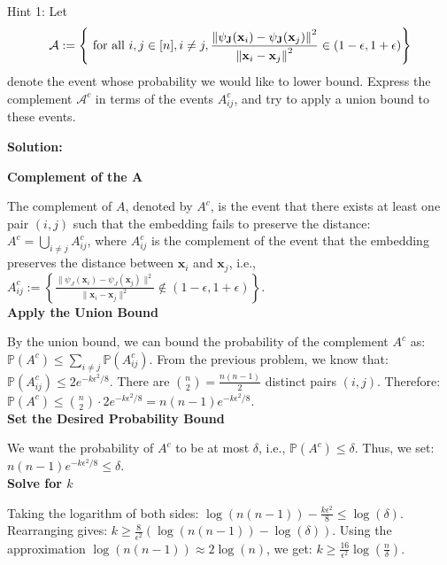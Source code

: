 \documentclass{article}
\newcommand{\mat}[1]{\mathbf{#1}}
\renewcommand{\vec}[1]{\boldsymbol{\mathbf{#1}}}
\newenvironment{solution}{\color{blue} \smallskip \textbf{Solution:}}{}
\begin{document}
\begin{enumerate}
Hint 1: Let 
\begin{align*}
		\mathcal{A} := \left\{\text{ for all } i, j \in [\num], i\neq j, 
	\frac{\norm{\psi_{\mat J}(\vec x_i) - \psi_{\mat J}(\vec x_j)}^2}{\norm{\vec x_i - \vec x_j}^2} \in (1-\epsilon, 1+\epsilon) \right\}
\end{align*}
denote the event whose probability we would like to lower bound. Express the complement $\mathcal{A}^c$ in terms of the events $A_{ij}^c$, and try to apply a union bound to these events.

\begin{solution}



\textbf{Complement of the A}

The complement of \(A\), denoted by \(A^c\), is the event that there exists at least one pair \((i, j)\) such that the embedding fails to preserve the distance: 
\( A^c = \bigcup_{i \neq j} A_{ij}^c \),
where \(A_{ij}^c\) is the complement of the event that the embedding preserves the distance between \(\mathbf{x}_i\) and \(\mathbf{x}_j\), i.e., 
\( A_{ij}^c := \left\{ \frac{\|\psi_J(\mathbf{x}_i) - \psi_J(\mathbf{x}_j)\|^2}{\|\mathbf{x}_i - \mathbf{x}_j\|^2} \notin (1 - \epsilon, 1 + \epsilon) \right\} \).\\

\textbf{Apply the Union Bound}

By the union bound, we can bound the probability of the complement \(A^c\) as:
\( \mathbb{P}(A^c) \leq \sum_{i \neq j} \mathbb{P}(A_{ij}^c) \).
From the previous problem, we know that:
\( \mathbb{P}(A_{ij}^c) \leq 2e^{-k \epsilon^2 / 8} \).
There are \(\binom{n}{2} = \frac{n(n-1)}{2}\) distinct pairs \((i, j)\). Therefore:
\( \mathbb{P}(A^c) \leq \binom{n}{2} \cdot 2e^{-k \epsilon^2 / 8} = n(n-1) e^{-k \epsilon^2 / 8} \).\\

\textbf{Set the Desired Probability Bound}

We want the probability of \(A^c\) to be at most \(\delta\), i.e.,
\( \mathbb{P}(A^c) \leq \delta \).
Thus, we set:
\( n(n-1) e^{-k \epsilon^2 / 8} \leq \delta \).\\

\textbf{Solve for \(k\)}

Taking the logarithm of both sides:
\( \log(n(n-1)) - \frac{k \epsilon^2}{8} \leq \log(\delta) \).
Rearranging gives:
\( k \geq \frac{8}{\epsilon^2} \left( \log(n(n-1)) - \log(\delta) \right) \).
Using the approximation \(\log(n(n-1)) \approx 2 \log(n)\), we get:
\( k \geq \frac{16}{\epsilon^2} \log \left( \frac{n}{\delta} \right) \).\\


\end{solution}
\end{enumerate}
\end{document}
